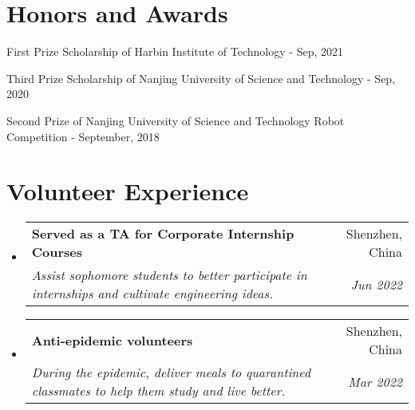 \documentclass[a4paper,20pt]{article}
\makeatletter
\newcommand{\resumeSubheading}[4]{
  \vspace{-1pt}\item
    \begin{tabular*}{0.97\textwidth}{l@{\extracolsep{\fill}}r}
      \textbf{#1} & #2 \\
      \textit{#3} & \textit{#4} \\
    \end{tabular*}\vspace{-5pt}
}
\newcommand{\resumeSubHeadingListStart}{\begin{itemize}[leftmargin=*]}
\newcommand{\resumeSubHeadingListEnd}{\end{itemize}}
\makeatother
\begin{document}
\section{Honors and Awards}
\begin{description}[font=$\bullet$]
\item {First Prize Scholarship of Harbin Institute of Technology - Sep, 2021}
\vspace{-5pt}
\item {Third Prize Scholarship of Nanjing University of Science and Technology - Sep, 2020}
\vspace{-5pt}
\item {Second Prize of Nanjing University of Science and Technology Robot Competition - September, 2018}

\end{description}

\vspace{-5pt}
\section{Volunteer Experience}
  \resumeSubHeadingListStart
	\resumeSubheading
    {Served as a TA for Corporate Internship Courses}{Shenzhen, China}
    {Assist sophomore students to better participate in internships and cultivate engineering ideas.}{Jun 2022}
\vspace{5pt}
    \resumeSubheading
    {Anti-epidemic volunteers}{Shenzhen, China}
    {During the epidemic, deliver meals to quarantined classmates to help them study and live better.}{Mar 2022}

\resumeSubHeadingListEnd
\end{document}
